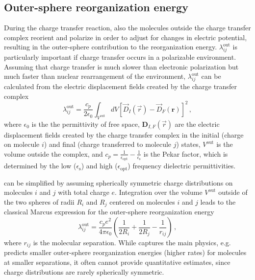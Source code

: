\subsection{Outer-sphere reorganization energy}
\label{sec:outer_reorganization}
During the charge transfer reaction, also the molecules outside the charge transfer complex reorient and polarize in order to adjust for changes in electric potential, resulting in the outer-sphere contribution to the reorganization energy. $\lambda_{ij}^\text{out}$ is particularly important if charge transfer occurs in a polarizable environment. Assuming that charge transfer is much slower than electronic polarization but much faster than nuclear rearrangement of the environment, $\lambda_{ij}^\text{out}$ can be calculated from the electric displacement fields created by the charge transfer complex~\cite{may_charge_2003}
\begin{equation}
\lambda_{ij}^\text{out}=
\frac{c_p}{2\epsilon_0}\int_{V^\text{out}}d V
\left[ \vec{D}_I(\vec{r}) - \vec{D}_F(\bm r) \right]^2\,,
\label{equ:lambda_outer1}
\end{equation}
where $\epsilon_0$ is the the permittivity of free space, $\bm{D}_{I,F}(\vec{r})$ are the electric displacement fields created by the charge transfer complex in the initial (charge on molecule $i$) and final (charge transferred to molecule $j$) states,  $V^\text{out}$ is the volume outside the complex, and $c_p=\frac{1}{\epsilon_\text{opt}}-\frac{1}{\epsilon_\text{s}}$ is the Pekar factor, which is determined by the low ($\epsilon_\text{s}$) and high ($\epsilon_\text{opt}$) frequency dielectric permittivities.

 can be simplified by assuming spherically symmetric charge distributions on molecules $i$ and $j$ with total charge $e$. Integration over the volume $V^\text{out}$ outside of the two spheres of radii $R_i$ and $R_j$ centered on molecules $i$ and $j$ leads to the classical Marcus expression for the outer-sphere reorganization energy
\begin{equation}
\lambda_{ij}^\text{out}=\frac{c_{p}e^2}{4\pi\epsilon_0}\left(\frac{1}{2 R_i}+\frac{1}{2 R_j}-\frac{1}{r_{ij}} \right)\,,
\label{equ:lambda_outer2}
\end{equation}
where $r_{ij}$ is the molecular separation.  While  captures the main physics, e.g. predicts smaller outer-sphere reorganization energies (higher rates) for molecules at smaller separations, it often cannot provide quantitative estimates, since charge distributions are rarely spherically symmetric. 

